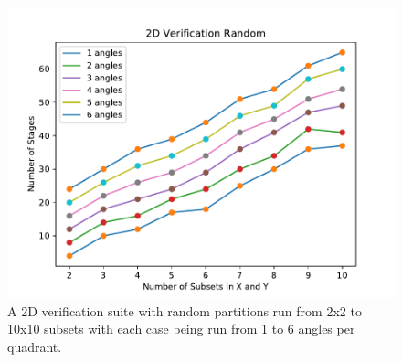 \begin{figure}[H]
\centering
\includegraphics[scale=0.8]{../figures/random_verification.pdf}
\caption{A 2D verification suite with random partitions run from 2x2 to 10x10 subsets with each case being run from 1 to 6 angles per quadrant.}
\label{random_verification}
\end{figure}

